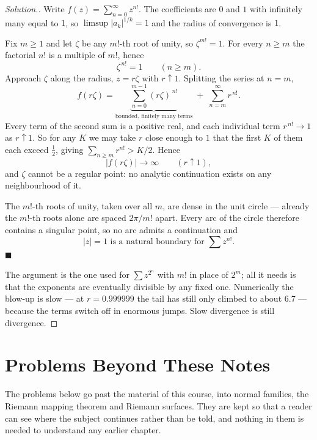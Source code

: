 \documentclass[11pt,a4paper]{article}
\theoremstyle{definition}
\newenvironment{solution}
  {\renewcommand{\qedsymbol}{}\begin{proof}[\textit{Solution}.]}
  {\end{proof}}
\begin{document}
\begin{solution}
Write $f(z) = \displaystyle\sum^{\infty}_{n=0} z^{n!}$. The coefficients are $0$
and $1$ with infinitely many equal to $1$, so
$\limsup\left|a_k\right|^{1/k} = 1$ and the radius of convergence is $1$.

Fix $m \geq 1$ and let $\zeta$ be any $m!$-th root of unity, so $\zeta^{m!} = 1$.
For every $n \geq m$ the factorial $n!$ is a multiple of $m!$, hence
$$\zeta^{\,n!} = 1 \qquad (n \geq m).$$
Approach $\zeta$ along the radius, $z = r\zeta$ with $r \uparrow 1$. Splitting the
series at $n = m$,
$$f(r\zeta) = \underbrace{\sum^{m-1}_{n=0} (r\zeta)^{\,n!}}_{\text{bounded, finitely many terms}}
\;+\; \sum^{\infty}_{n=m} r^{\,n!} .$$
Every term of the second sum is a positive real, and each individual term
$r^{\,n!} \rightarrow 1$ as $r \uparrow 1$. So for any $K$ we may take $r$ close
enough to $1$ that the first $K$ of them each exceed $\tfrac12$, giving
$\sum_{n\geq m} r^{n!} > K/2$. Hence
$$\left|f(r\zeta)\right| \longrightarrow \infty \qquad (r \uparrow 1),$$
and $\zeta$ cannot be a regular point: no analytic continuation exists on any
neighbourhood of it.

The $m!$-th roots of unity, taken over all $m$, are dense in the unit circle ---
already the $m!$-th roots alone are spaced $2\pi/m!$ apart. Every arc of the circle
therefore contains a singular point, so no arc admits a continuation and
$$\boxed{\left|z\right| = 1 \text{ is a natural boundary for } \sum z^{n!}.}$$
$\blacksquare$

The argument is the one used for $\sum z^{2^{n}}$ with $m!$ in place of $2^{m}$;
all it needs is that the exponents are eventually divisible by any fixed one.
Numerically the blow-up is slow --- at $r = 0.999999$ the tail has still only
climbed to about $6.7$ --- because the terms switch off in enormous jumps. Slow
divergence is still divergence.
\end{solution}




\pagebreak
{\color[wave]{485}\section{Problems Beyond These Notes}}

The problems below go past the material of this course, into normal families, the
Riemann mapping theorem and Riemann surfaces. They are kept so that a reader can
see where the subject continues rather than be told, and nothing in them is
needed to understand any earlier chapter.
\end{document}
